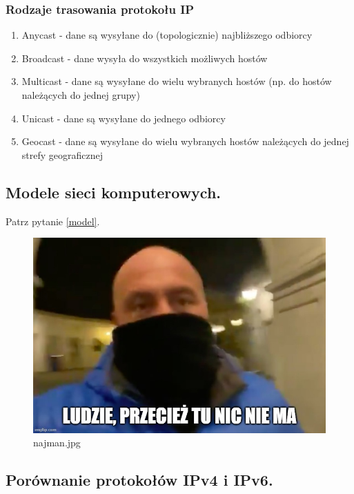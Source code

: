 \documentclass[a4paper,12pt,oneside]{book}
\begin{document}
			\subsubsection{Rodzaje trasowania protokołu IP}
			\begin{enumerate}
				\item Anycast - dane są wysyłane do (topologicznie) najbliższego odbiorcy
				\item Broadcast - dane wysyła do wszystkich możliwych hostów
				\item Multicast - dane są wysyłane do wielu wybranych hostów (np. do hostów należących
				do jednej grupy)
				\item Unicast - dane są wysyłane do jednego odbiorcy
				\item Geocast - dane są wysyłane do wielu wybranych hostów należących do jednej strefy
				geograficznej
			\end{enumerate}
			\newpage\subsection{Modele sieci komputerowych.}
				Patrz pytanie \ref{model}.
				\begin{figure}[h!]
					\centering\includegraphics[scale=0.45]{najman.jpg}
					\caption{najman.jpg}
				\end{figure}
			\newpage\subsection{Porównanie protokołów IPv4 i IPv6.}
\end{document}
